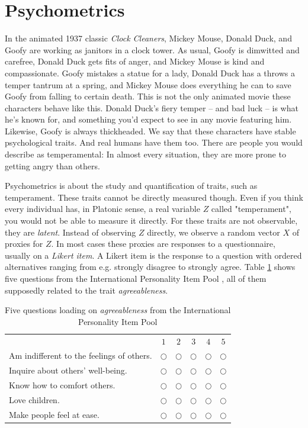 
\section{Psychometrics}
In the animated 1937 classic \textit{Clock Cleaners}, Mickey Mouse, Donald Duck, and Goofy are working as janitors in a clock tower. As usual, Goofy is dimwitted and carefree, Donald Duck gets fits of anger, and Mickey Mouse is kind and compassionate. Goofy mistakes a statue for a lady, Donald Duck has a throws a temper tantrum at a spring, and Mickey Mouse does everything he can to save Goofy from falling to certain death. This is not the only animated movie these characters behave like this. Donald Duck's fiery temper -- and bad luck -- is what he's known for, and something you'd expect to see in any movie featuring him. Likewise, Goofy is always thickheaded. We say that these characters have stable psychological traits. And real humans have them too. There are people you would describe as temperamental: In almost every situation, they are more prone to getting angry than others.

Psychometrics is about the study and quantification of traits, such as temperament. These traits cannot be directly measured though. Even if you think every individual has, in Platonic sense, a real variable $Z$ called "temperament", you would not be able to measure it directly. For these traits are not observable, they are \textit{latent}. Instead of observing $Z$ directly, we observe a random vector $X$ of proxies for $Z$. In most cases these proxies are responses to a questionnaire, usually on a \emph{Likert item}. A Likert item is the response to a question with ordered alternatives ranging from e.g. strongly disagree to strongly agree. Table \ref{tab:IPIP} shows five questions from the International Personality Item Pool \parencite{Goldberg1992-hp}, all of them supposedly related to the trait \textit{agreeableness}.

\begin{table}
\caption{\label{tab:IPIP}Five questions loading on \textit{agreeableness} from the International Personality Item Pool}
\noindent \begin{centering}
\begin{tabular}{lccccc}
 & $1$ & $2$ & $3$ & $4$ & $5$\tabularnewline
Am indifferent to the feelings of others.  & $\bigcirc$ & $\bigcirc$ & $\bigcirc$ & $\bigcirc$ & $\bigcirc$\tabularnewline
Inquire about others' well-being. & $\bigcirc$ & $\bigcirc$ & $\bigcirc$ & $\bigcirc$ & $\bigcirc$\tabularnewline
Know how to comfort others. & $\bigcirc$ & $\bigcirc$ & $\bigcirc$ & $\bigcirc$ & $\bigcirc$\tabularnewline
Love children. & $\bigcirc$ & $\bigcirc$ & $\bigcirc$ & $\bigcirc$ & $\bigcirc$\tabularnewline
Make people feel at ease.  & $\bigcirc$ & $\bigcirc$ & $\bigcirc$ & $\bigcirc$ & $\bigcirc$\tabularnewline
\end{tabular}
\par\end{centering}
\vskip7.0pt
\noindent {}
\end{table}

